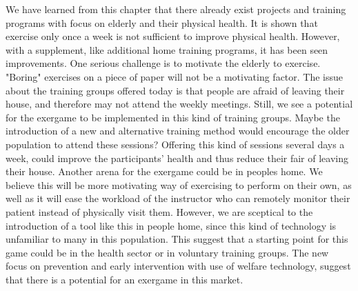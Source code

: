 We have learned from this chapter that there already exist projects and training programs with focus on elderly and their physical health. It is shown that exercise only once a week is not sufficient to improve physical health. However, with a supplement, like additional home training programs, it has been seen improvements. One serious challenge is to motivate the elderly to exercise. "Boring" exercises on a piece of paper will not be a motivating factor. The issue about the training groups offered today is that people are afraid of leaving their house, and therefore may not attend the weekly meetings. Still, we see a potential for the exergame to be implemented in this kind of training groups. Maybe the introduction of a new and alternative training method would encourage the older population to attend these sessions? Offering this kind of sessions several days a week, could improve the participants' health and thus reduce their fair of leaving their house.  Another arena for the exergame could be in peoples home. We believe this will be more motivating way of exercising to perform on their own, as well as it will ease the workload of the instructor who can remotely monitor their patient instead of physically visit them. However, we are sceptical to the introduction of a tool like this in people home, since this kind of technology is unfamiliar to many in this population. This suggest that a starting point for this game could be in the health sector or in voluntary training groups.  The new focus on prevention and early intervention with use of welfare technology, suggest that there is a potential for an exergame in this market. 

